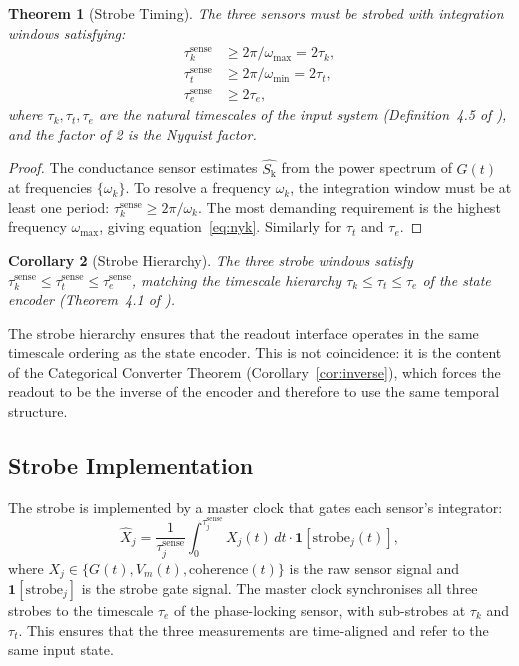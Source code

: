 \documentclass[11pt,twocolumn,a4paper]{article}
\newtheorem{theorem}{Theorem}[section]
\newtheorem{corollary}[theorem]{Corollary}
\theoremstyle{definition}
\theoremstyle{remark}
\newcommand{\Sk}{S_{\mathrm{k}}}
\begin{document}
\begin{theorem}[Strobe Timing]
\label{thm:strobe}
The three sensors must be strobed with integration windows satisfying:
\begin{align}
\tau_k^{\mathrm{sense}} &\geq 2\pi / \omega_{\max} = 2\tau_k, \label{eq:nyk}\\
\tau_t^{\mathrm{sense}} &\geq 2\pi / \omega_{\min} = 2\tau_t, \label{eq:nyt}\\
\tau_e^{\mathrm{sense}} &\geq 2\tau_e, \label{eq:nye}
\end{align}
where $\tau_k, \tau_t, \tau_e$ are the natural timescales of the input system
(Definition~4.5 of \citep{companion2}), and the factor of 2 is the Nyquist
factor.
\end{theorem}

\begin{proof}
The conductance sensor estimates $\hat{\Sk}$ from the power spectrum of $G(t)$
at frequencies $\{\omega_k\}$. To resolve a frequency $\omega_k$, the integration
window must be at least one period: $\tau_k^{\mathrm{sense}} \geq 2\pi/\omega_k$.
The most demanding requirement is the highest frequency
$\omega_{\max}$, giving equation~\eqref{eq:nyk}. Similarly for $\tau_t$ and $\tau_e$.
\end{proof}

\begin{corollary}[Strobe Hierarchy]
\label{cor:strobeorder}
The three strobe windows satisfy $\tau_k^{\mathrm{sense}} \leq
\tau_t^{\mathrm{sense}} \leq \tau_e^{\mathrm{sense}}$, matching the timescale
hierarchy $\tau_k \leq \tau_t \leq \tau_e$ of the state encoder (Theorem~4.1
of \citep{companion2}).
\end{corollary}

The strobe hierarchy ensures that the readout interface operates in the same
timescale ordering as the state encoder. This is not coincidence: it is the
content of the Categorical Converter Theorem (Corollary~\ref{cor:inverse}),
which forces the readout to be the inverse of the encoder and therefore to use
the same temporal structure.

\subsection{Strobe Implementation}

The strobe is implemented by a master clock that gates each sensor's integrator:
\begin{equation}
\hat{X}_j = \frac{1}{\tau_j^{\mathrm{sense}}} \int_0^{\tau_j^{\mathrm{sense}}}
X_j(t) \, dt \cdot \mathbf{1}[\mathrm{strobe}_j(t)],
\label{eq:strobe}
\end{equation}
where $X_j \in \{G(t), V_m(t), \mathrm{coherence}(t)\}$ is the raw sensor
signal and $\mathbf{1}[\mathrm{strobe}_j]$ is the strobe gate signal.
The master clock synchronises all three strobes to the timescale $\tau_e$ of
the phase-locking sensor, with sub-strobes at $\tau_k$ and $\tau_t$.
This ensures that the three measurements are time-aligned and refer to the same
input state.
\end{document}
